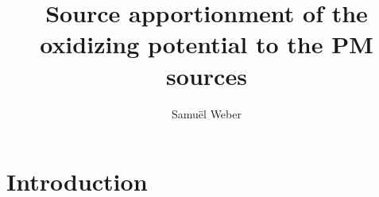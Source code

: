 \documentclass[a4paper,12pt]{memoir}
\author{Samuël Weber}
\title{Source apportionment of the oxidizing potential to the PM sources}
\begin{document}



\maketitle

\newpage
%
%
%
%
%
%
%

\tableofcontents
\listoftables
\listoffigures

\part{Introduction}%
\label{cha:introduction}
\end{document}
